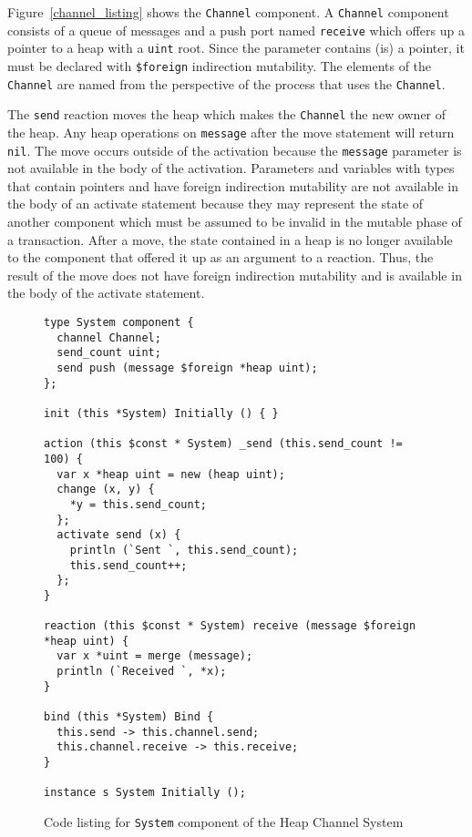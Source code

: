 Figure~\ref{channel_listing} shows the \verb+Channel+ component.
A \verb+Channel+ component consists of a queue of messages and a push port named \verb+receive+ which offers up a pointer to a heap with a \verb+uint+ root.
Since the parameter contains (is) a pointer, it must be declared with \verb+$foreign+ indirection mutability.
The elements of the \verb+Channel+ are named from the perspective of the process that uses the \verb+Channel+.

The \verb+send+ reaction moves the heap which makes the \verb+Channel+ the new owner of the heap.
Any heap operations on \verb+message+ after the move statement will return \verb+nil+.
The move occurs outside of the activation because the \verb+message+ parameter is not available in the body of the activation.
Parameters and variables with types that contain pointers and have foreign indirection mutability are not available in the body of an activate statement because they may represent the state of another component which must be assumed to be invalid in the mutable phase of a transaction.
After a move, the state contained in a heap is no longer available to the component that offered it up as an argument to a reaction.
Thus, the result of the move does not have foreign indirection mutability and is available in the body of the activate statement.

\begin{figure}
\begin{verbatim}
type System component {
  channel Channel;
  send_count uint;
  send push (message $foreign *heap uint);
};

init (this *System) Initially () { }

action (this $const * System) _send (this.send_count != 100) {
  var x *heap uint = new (heap uint);
  change (x, y) {
    *y = this.send_count;
  };
  activate send (x) {
    println (`Sent `, this.send_count);
    this.send_count++;
  };
}

reaction (this $const * System) receive (message $foreign *heap uint) {
  var x *uint = merge (message);
  println (`Received `, *x);
}

bind (this *System) Bind {
  this.send -> this.channel.send;
  this.channel.receive -> this.receive;
}

instance s System Initially ();
\end{verbatim}
\cprotect\caption{Code listing for \verb+System+ component of the Heap Channel System}
\label{channel_system_listing}
\end{figure}

